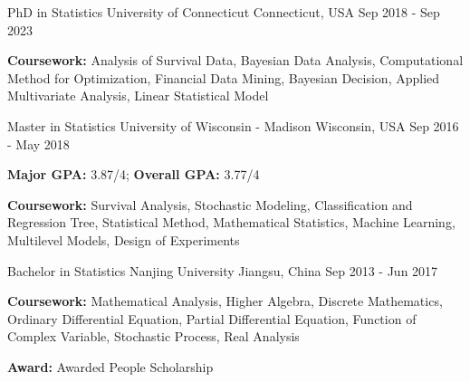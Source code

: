 

\begin{cventries}

  \cventry
    {PhD in Statistics} %
    {University of Connecticut} %
    {Connecticut, USA} %
    {Sep 2018 - Sep 2023} %
    {
      \begin{cvitems} %
        \item {\textbf{Coursework:} 
        Analysis of Survival Data, Bayesian Data Analysis, 
        Computational Method for Optimization, Financial Data Mining, 
        Bayesian Decision, Applied Multivariate Analysis, Linear Statistical Model}
      \end{cvitems}
    }

    \cventry
    {Master in Statistics} %
    {University of Wisconsin - Madison} %
    {Wisconsin, USA} %
    {Sep 2016 - May 2018} %
    {
      \begin{cvitems} %
        \item {\textbf{Major GPA:} 3.87/4; \textbf{Overall GPA:} 3.77/4}
        \item {\textbf{Coursework:} Survival Analysis, Stochastic Modeling, 
        Classification and Regression Tree, Statistical Method, 
        Mathematical Statistics, Machine Learning, Multilevel Models, Design of Experiments}
      \end{cvitems}
    }

    \cventry
    {Bachelor in Statistics} %
    {Nanjing University} %
    {Jiangsu, China} %
    {Sep 2013 - Jun 2017} %
    {
      \begin{cvitems} %
        \item {\textbf{Coursework:} Mathematical Analysis, Higher Algebra, 
        Discrete Mathematics, Ordinary Differential Equation, 
        Partial Differential Equation, Function of Complex Variable, 
        Stochastic Process, Real Analysis}
        \item {\textbf{Award:} Awarded People Scholarship}
      \end{cvitems}
    }

\end{cventries}
